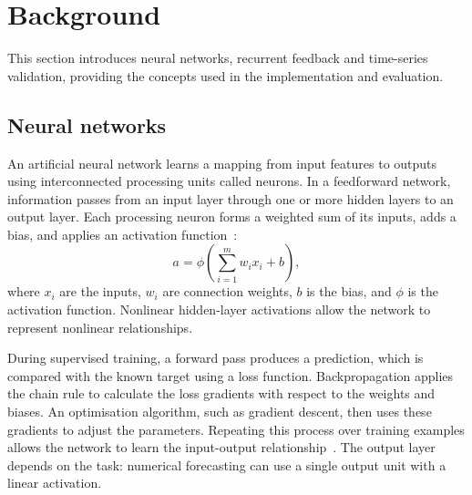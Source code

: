 \section{Background}
\label{sec:background}

This section introduces neural networks, recurrent feedback and time-series
validation, providing the concepts used in the implementation and evaluation.

\subsection{Neural networks}
An artificial neural network learns a mapping from input features to outputs
using interconnected processing units called neurons. In a feedforward network,
information passes from an input layer through one or more hidden layers to an
output layer. Each processing neuron forms a weighted sum of its inputs, adds a
bias, and applies an activation function~\cite[Sec.~8.2]{Kelleher2020}:
\begin{equation}
  a = \phi\left(\sum_{i=1}^{m} w_i x_i + b\right),
\end{equation}
where $x_i$ are the inputs, $w_i$ are connection weights, $b$ is the bias, and
$\phi$ is the activation function. Nonlinear hidden-layer activations allow the
network to represent nonlinear relationships.

During supervised training, a forward pass produces a prediction, which is
compared with the known target using a loss function. Backpropagation applies
the chain rule to calculate the loss gradients with respect to the weights and
biases. An optimisation algorithm, such as gradient descent, then uses these
gradients to adjust the parameters. Repeating this process over training
examples allows the network to learn the input-output
relationship~\cite[Sec.~8.3]{Kelleher2020}. The output layer depends on the task:
numerical forecasting can use a single output unit with a linear activation.


